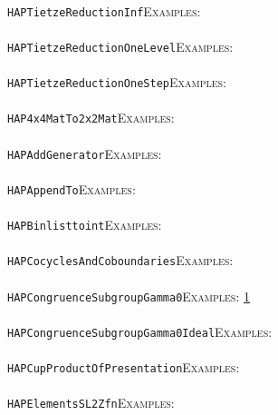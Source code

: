 \documentclass[a4paper,11pt]{report}
\begin{document}
{{ \\
 \texttt{HAPTietzeReduction{\textunderscore}Inf}{\nobreakspace}{\nobreakspace}{\nobreakspace}{\nobreakspace}\textsc{Examples:} \\
 \\
 \texttt{HAPTietzeReduction{\textunderscore}OneLevel}{\nobreakspace}{\nobreakspace}{\nobreakspace}{\nobreakspace}\textsc{Examples:} \\
 \\
 \texttt{HAPTietzeReduction{\textunderscore}OneStep}{\nobreakspace}{\nobreakspace}{\nobreakspace}{\nobreakspace}\textsc{Examples:} \\
 \\
 \texttt{HAP{\textunderscore}4x4MatTo2x2Mat}{\nobreakspace}{\nobreakspace}{\nobreakspace}{\nobreakspace}\textsc{Examples:} \\
 \\
 \texttt{HAP{\textunderscore}AddGenerator}{\nobreakspace}{\nobreakspace}{\nobreakspace}{\nobreakspace}\textsc{Examples:} \\
 \\
 \texttt{HAP{\textunderscore}AppendTo}{\nobreakspace}{\nobreakspace}{\nobreakspace}{\nobreakspace}\textsc{Examples:} \\
 \\
 \texttt{HAP{\textunderscore}Binlisttoint}{\nobreakspace}{\nobreakspace}{\nobreakspace}{\nobreakspace}\textsc{Examples:} \\
 \\
 \texttt{HAP{\textunderscore}CocyclesAndCoboundaries}{\nobreakspace}{\nobreakspace}{\nobreakspace}{\nobreakspace}\textsc{Examples:} \\
 \\
 \texttt{HAP{\textunderscore}CongruenceSubgroupGamma0}{\nobreakspace}{\nobreakspace}{\nobreakspace}{\nobreakspace}\textsc{Examples:} \href{tutorial/chap10.html} {1}{\nobreakspace} \\
 \\
 \texttt{HAP{\textunderscore}CongruenceSubgroupGamma0Ideal}{\nobreakspace}{\nobreakspace}{\nobreakspace}{\nobreakspace}\textsc{Examples:} \\
 \\
 \texttt{HAP{\textunderscore}CupProductOfPresentation}{\nobreakspace}{\nobreakspace}{\nobreakspace}{\nobreakspace}\textsc{Examples:} \\
 \\
 \texttt{HAP{\textunderscore}ElementsSL2Zfn}{\nobreakspace}{\nobreakspace}{\nobreakspace}{\nobreakspace}\textsc{Examples:} \\
}}
\end{document}
